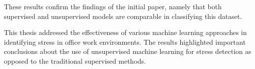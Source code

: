 \vspace{0.5cm}

These results confirm the findings of the initial paper, namely that both supervised and unsupervised models are comparable in classifying this dataset.

\vspace{0.5cm}

This thesis addressed the effectiveness of various machine learning approaches in identifying stress in office work environments. The results highlighted important conclusions about the use of unsupervised machine learning for stress detection as opposed to the traditional supervised methods.
